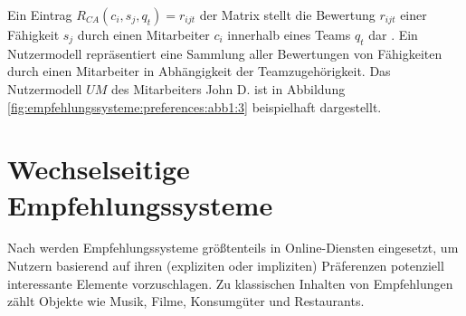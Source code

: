 Ein Eintrag $R_{CA}(c_{i},s_{j},q_{t}) = r_{ijt}$ der Matrix stellt die Bewertung $r_{ijt}$ einer Fähigkeit $s_{j}$ durch einen Mitarbeiter $c_{i}$ innerhalb eines Teams $q_{t}$ dar \cite[S. 198]{adomavicius:3:inbook}.
Ein Nutzermodell repräsentiert eine Sammlung aller Bewertungen von Fähigkeiten durch einen Mitarbeiter in Abhängigkeit der Teamzugehörigkeit.
Das Nutzermodell $UM$ des Mitarbeiters John D. ist in Abbildung \ref{fig:empfehlungssysteme:preferences:abb1:3} beispielhaft dargestellt.

\section{Wechselseitige Empfehlungssysteme}
\label{ch:empfehlungssysteme:rrs}
Nach \textcite[S. 2429]{palomares:inproceedings} werden Empfehlungssysteme größtenteils in Online-Diensten eingesetzt, um Nutzern basierend auf ihren (expliziten oder impliziten) Präferenzen potenziell interessante Elemente vorzuschlagen.
Zu klassischen Inhalten von Empfehlungen zählt \textcite[S. 2429]{palomares:inproceedings} Objekte wie Musik, Filme, Konsumgüter und Restaurants. 
 
